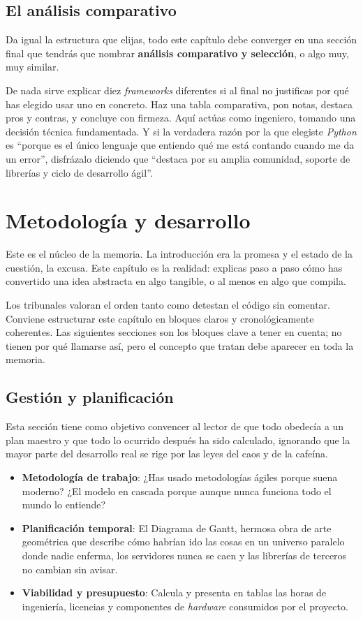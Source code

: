 \section{El análisis comparativo}

Da igual la estructura que elijas, todo este capítulo debe converger en una sección final que tendrás que nombrar \textbf{análisis comparativo y selección}, o algo muy, muy similar.

De nada sirve explicar diez \textit{frameworks} diferentes si al final no justificas por qué has elegido usar uno en concreto. Haz una tabla comparativa, pon notas, destaca pros y contras, y concluye con firmeza. Aquí actúas como ingeniero, tomando una decisión técnica fundamentada. Y si la verdadera razón por la que elegiste \textit{Python} es \enquote{porque es el único lenguaje que entiendo qué me está contando cuando me da un error}, disfrázalo diciendo que \enquote{destaca por su amplia comunidad, soporte de librerías y ciclo de desarrollo ágil}.

\chapter{Metodología y desarrollo}
\label{ch:desarrollo}

Este es el núcleo de la memoria. La introducción era la promesa y el estado de la cuestión, la excusa. Este capítulo es la realidad: explicas paso a paso cómo has convertido una idea abstracta en algo tangible, o al menos en algo que compila.

Los tribunales valoran el orden tanto como detestan el código sin comentar. Conviene estructurar este capítulo en bloques claros y cronológicamente coherentes. Las siguientes secciones son los bloques clave a tener en cuenta; no tienen por qué llamarse así, pero el concepto que tratan debe aparecer en toda la memoria.

\section{Gestión y planificación}


Esta sección tiene como objetivo convencer al lector de que todo obedecía a un plan maestro y que todo lo ocurrido después ha sido calculado, ignorando que la mayor parte del desarrollo real se rige por las leyes del caos y de la cafeína.

\begin{itemize}
    \item \textbf{Metodología de trabajo}: ¿Has usado metodologías ágiles porque suena moderno? ¿El modelo en cascada porque aunque nunca funciona todo el mundo lo entiende?
    \item \textbf{Planificación temporal}: El Diagrama de Gantt, hermosa obra de arte geométrica que describe cómo habrían ido las cosas en un universo paralelo donde nadie enferma, los servidores nunca se caen y las librerías de terceros no cambian sin avisar.
    \item \textbf{Viabilidad y presupuesto}: Calcula y presenta en tablas las horas de ingeniería, licencias y componentes de \textit{hardware} consumidos por el proyecto.
\end{itemize}

